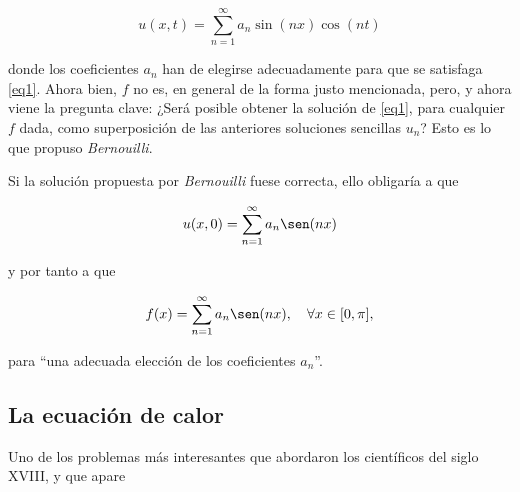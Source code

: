 \begin{equation}\label{eq4}
	u(x,t) = \sum_{n=1}^{\infty} a_n \sin(nx) \cos(nt)
\end{equation}
\newline

donde los coeficientes \( a_n \) han de elegirse adecuadamente para que se satisfaga
\ref{eq1}.
\newline
Ahora bien, \( f \) no es, en general de la forma justo mencionada, pero, y ahora 
viene la pregunta clave: ¿Será posible obtener la solución de \ref{eq1}, para cualquier 
\( f \) dada, como superposición de las anteriores soluciones sencillas \( u_n \)? Esto es
lo que propuso \textit{Bernouilli}.

Si la solución propuesta por \textit{Bernouilli} fuese correcta, ello obligaría a que

\begin{equation}\label{eq5}
	u(x, 0) = \sum_{n=1}^{\infty} a_n \sen(nx)
\end{equation}

y por tanto a que

\begin{equation}\label{eq6}
f(x) = \sum_{n=1}^{\infty} a_n \sen(nx), \quad \forall x \in [0, \pi],
\end{equation}

para “una adecuada elección de los coeficientes \( a_n \)”.


\subsection{La ecuación de calor}

Uno de los problemas más interesantes que abordaron los científicos del siglo XVIII, y que apare


%
%
